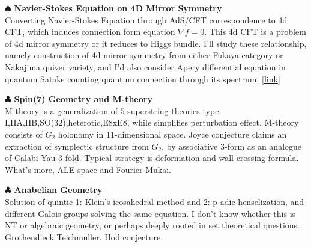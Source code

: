 \documentclass{article}
\begin{document}
\begin{minipage}{\textwidth}
\noindent
\begin{minipage}{\textwidth}
\noindent $\spadesuit$ \textbf{Navier-Stokes Equation on 4D Mirror Symmetry} \\
Converting Navier-Stokes Equation through AdS/CFT correspondence to 4d CFT, which induces connection form equation $\nabla f=0$.
This 4d CFT is a problem of 4d mirror symmetry or it reduces to Higgs bundle. 
I'll study these relationship, namely construction of 4d mirror symmetry from either Fukaya category or Nakajima quiver variety,
and I'd also consider Apery differential equation in quantum Satake counting quantum connection through its spectrum. 
\href{https://kojisunami.github.io/src/pde.pdf}{[link]}  
\end{minipage}

\noindent
\begin{minipage}{\textwidth}
\noindent $\clubsuit$ \textbf{Spin(7) Geometry and M-theory} \\
M-theory is a generalization of $5$-superstring theories type I,IIA,IIB,SO(32),heterotic,E8xE8, while simplifies perturbation effect.
M-theory consists of $G_2$ holonomy in $11$-dimensional space. Joyce conjecture claims an extraction of symplectic structure from $G_2$,
by associative 3-form as an analogue of Calabi-Yau 3-fold. Typical strategy is deformation and wall-crossing formula.
What's more, ALE space and Fourier-Mukai.
\end{minipage}

\noindent
\begin{minipage}{\textwidth}
\noindent $\clubsuit$ \textbf{Anabelian Geometry} \\
Solution of quintic 1: Klein's icosahedral method and 2: p-adic henselization, and different Galois groups solving the same equation.
I don't know whether this is NT or algebraic geometry, or perhaps deeply rooted in set theoretical questions.
Grothendieck Teichmuller. Hod conjecture.
\end{minipage}
\end{minipage}
\end{document}
